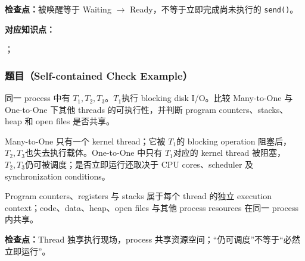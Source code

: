 \textbf{检查点：}被唤醒等于 Waiting $\rightarrow$ Ready，不等于立即完成尚未执行的 \texttt{send()}。


\textbf{对应知识点：}\par
{}；

\subsubsection*{题目（Self-contained Check Example）}

同一 process 中有 $T_1,T_2,T_3$。$T_1$执行 blocking disk I/O。比较 Many-to-One 与 One-to-One 下其他 threads 的可执行性，并判断 program counters、stacks、heap 和 open files 是否共享。

\begin{checkedsolution}
Many-to-One 只有一个 kernel thread；它被 $T_1$的 blocking operation 阻塞后，$T_2,T_3$也失去执行载体。One-to-One 中只有 $T_1$对应的 kernel thread 被阻塞，$T_2,T_3$仍可被调度；是否立即运行还取决于 CPU cores、scheduler 及 synchronization conditions。

Program counters、registers 与 stacks 属于每个 thread 的独立 execution context；code、data、heap、open files 与其他 process resources 在同一 process 内共享。
\end{checkedsolution}

\textbf{检查点：}Thread 独享执行现场，process 共享资源空间；“仍可调度”不等于“必然立即运行”。
